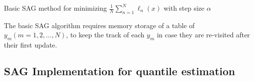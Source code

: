 \begin{algorithm}
    \caption{Basic SAG method for minimizing $\frac{1}{N} \sum^N_{n=1}\ell_n(x)$ with step size $\alpha$}\label{alg:SAG_ori}
        \begin{algorithmic}[1]
                       
                                    
            \EndFor
        \end{algorithmic}
\end{algorithm}

The basic SAG algorithm requires memory storage of a table of $y_m (m= 1, 2, ...,N)$, to keep the track of each $y_m$ in case they are re-visited after their first update.

\subsection{SAG Implementation for quantile estimation}

